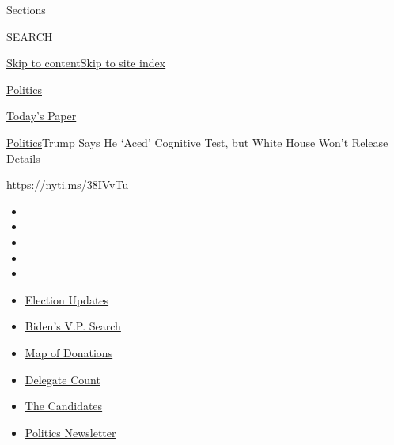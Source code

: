 Sections

SEARCH

\protect\hyperlink{site-content}{Skip to
content}\protect\hyperlink{site-index}{Skip to site index}

\href{https://www.nytimes.com/section/politics}{Politics}

\href{https://myaccount.nytimes.com/auth/login?response_type=cookie\&client_id=vi}{}

\href{https://www.nytimes.com/section/todayspaper}{Today's Paper}

\href{/section/politics}{Politics}\textbar{}Trump Says He `Aced'
Cognitive Test, but White House Won't Release Details

\url{https://nyti.ms/38IVvTu}

\begin{itemize}
\item
\item
\item
\item
\item
\end{itemize}

\begin{itemize}
\item
  \href{https://www.nytimes.com/2020/07/31/us/elections/biden-vs-trump.html?action=click\&pgtype=Article\&state=default\&region=TOP_BANNER\&context=storylines_menu}{Election
  Updates}
\item
  \href{https://www.nytimes.com/article/biden-vice-president-2020.html?action=click\&pgtype=Article\&state=default\&region=TOP_BANNER\&context=storylines_menu}{Biden's
  V.P. Search}
\item
  \href{https://www.nytimes.com/interactive/2020/07/24/us/politics/trump-biden-campaign-donors.html?action=click\&pgtype=Article\&state=default\&region=TOP_BANNER\&context=storylines_menu}{Map
  of Donations}
\item
  \href{https://www.nytimes.com/interactive/2020/us/elections/delegate-count-primary-results.html?action=click\&pgtype=Article\&state=default\&region=TOP_BANNER\&context=storylines_menu}{Delegate
  Count}
\item
  \href{https://www.nytimes.com/interactive/2019/us/politics/2020-presidential-candidates.html?action=click\&pgtype=Article\&state=default\&region=TOP_BANNER\&context=storylines_menu}{The
  Candidates}
\item
  \href{https://www.nytimes.com/newsletters/politics?action=click\&pgtype=Article\&state=default\&region=TOP_BANNER\&context=storylines_menu}{Politics
  Newsletter}
\end{itemize}

